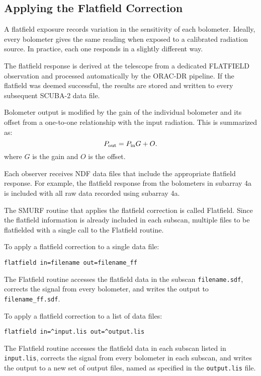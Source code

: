 \documentclass[twoside,11pt]{article}
\renewcommand{\_}{\texttt{\symbol{95}}}
\begin{document}
\subsection{Applying the Flatfield Correction}

A flatfield exposure records variation in the sensitivity of each
bolometer. Ideally, every bolometer gives the same reading when
exposed to a calibrated radiation source. In practice, each one
responds in a slightly different way.

The flatfield response is derived at the telescope from a dedicated
FLATFIELD observation and processed automatically by the ORAC-DR
pipeline. If the flatfield was deemed successful, the results are
stored and written to every subsequent SCUBA-2 data file.

Bolometer output is modified by the gain of the individual bolometer
and its offset from a one-to-one relationship with the input
radiation. This is summarized as:
\begin{equation}
P_{\rm out} = P_{\rm in} G + O.
\end{equation}
where $G$ is the gain and $O$ is the offset.

Each observer receives NDF data files that include the appropriate
flatfield response. For example, the flatfield response from the
bolometers in subarray 4a is included with all raw data recorded using
subarray 4a.

The SMURF routine that applies the flatfield correction is called
Flatfield. Since the flatfield information is already included in each
subscan, multiple files to be flatfielded with a single call to the
Flatfield routine.

To apply a flatfield correction to a single data file:
\begin{verbatim}
flatfield in=filename out=filename_ff
\end{verbatim}
The Flatfield routine accesses the flatfield data in the subscan
\verb-filename.sdf-, corrects the signal from every bolometer, and
writes the output to \verb-filename_ff.sdf-.

To apply a flatfield correction to a list of data files:
\begin{verbatim}
flatfield in=^input.lis out=^output.lis
\end{verbatim}
The Flatfield routine accesses the flatfield data in each subscan
listed in \verb-input.lis-, corrects the signal from every bolometer
in each subscan, and writes the output to a new set of output files,
named as specified in the \verb-output.lis- file.
\end{document}
